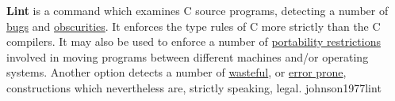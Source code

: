 \documentclass{article}
\begin{document}

  {\textbf{Lint} is a command which examines C source programs, detecting a number of \ul{bugs} and \ul{obscurities}. It enforces the type rules of C more strictly than the C compilers. It may also be used to enforce a number of \ul{portability restrictions} involved in moving programs between different machines and/or operating systems. Another option detects a number of \ul{wasteful}, or \ul{error prone}, constructions which nevertheless are, strictly speaking, legal.}
  {johnson1977lint}
\end{document}
